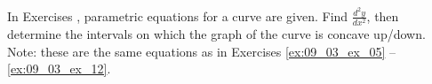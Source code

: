 {\noindent In Exercises}
{, parametric equations for a curve are given. Find $\frac{d^2y}{dx^2}$, then determine the intervals on which the graph of the curve is concave up/down. Note: these are the same equations as in Exercises \ref{ex:09_03_ex_05} -- \ref{ex:09_03_ex_12}.
}
